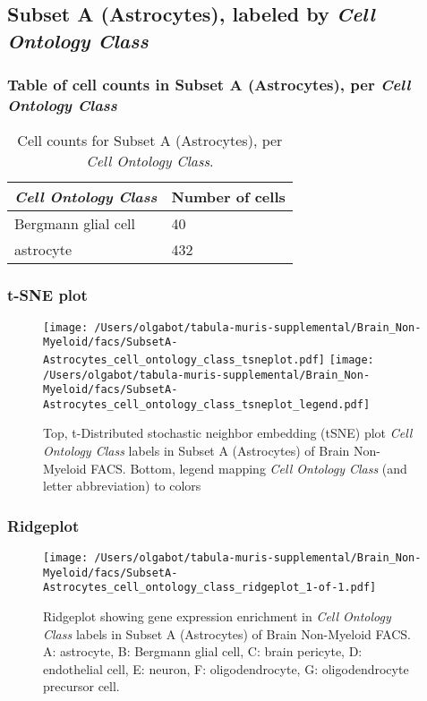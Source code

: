 \clearpage

\subsection{Subset A (Astrocytes), labeled by \emph{Cell Ontology Class}}
\subsubsection{Table of cell counts in Subset A (Astrocytes), per \emph{Cell Ontology Class}}\begin{table}[h]
\centering
\label{my-label}
\begin{tabular}{@{}ll@{}}
\toprule

\emph{Cell Ontology Class}& Number of cells \\ \midrule
Bergmann glial cell & 40 \\

astrocyte & 432 \\
\bottomrule
\end{tabular}
\caption{Cell counts for Subset A (Astrocytes), per \emph{Cell Ontology Class}.}
\end{table}

\clearpage
\subsubsection{t-SNE plot}
\begin{figure}[h]
\centering
\texttt{[image: /Users/olgabot/tabula-muris-supplemental/Brain\_Non-Myeloid/facs/SubsetA-Astrocytes\_cell\_ontology\_class\_tsneplot.pdf]}
\texttt{[image: /Users/olgabot/tabula-muris-supplemental/Brain\_Non-Myeloid/facs/SubsetA-Astrocytes\_cell\_ontology\_class\_tsneplot\_legend.pdf]}
\caption{Top, t-Distributed stochastic neighbor embedding (tSNE) plot  \emph{Cell Ontology Class} labels in Subset A (Astrocytes) of Brain Non-Myeloid FACS. Bottom, legend mapping \emph{Cell Ontology Class} (and letter abbreviation) to colors}
\end{figure}


\clearpage

\subsubsection{Ridgeplot}
\begin{figure}[h]
\centering
\texttt{[image: /Users/olgabot/tabula-muris-supplemental/Brain\_Non-Myeloid/facs/SubsetA-Astrocytes\_cell\_ontology\_class\_ridgeplot\_1-of-1.pdf]}

\caption{ Ridgeplot  showing gene expression enrichment in \emph{Cell Ontology Class} labels in Subset A (Astrocytes) of Brain Non-Myeloid FACS. A: astrocyte, B: Bergmann glial cell, C: brain pericyte, D: endothelial cell, E: neuron, F: oligodendrocyte, G: oligodendrocyte precursor cell.}
\end{figure}


